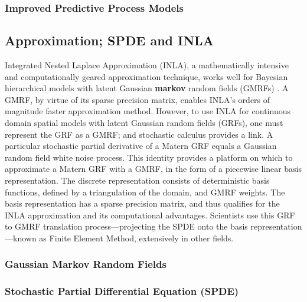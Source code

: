 \subsubsection{Improved Predictive Process Models}


\subsection{Approximation; SPDE and INLA} %
Integrated Nested Laplace Approximation (INLA), a mathematically intensive and computationally geared approximation technique, works well for Bayesian hierarchical models with latent Gaussian {\bf markov} random fields (GMRFs) \citep{Rue2007}. A GMRF, by virtue of its sparse precision matrix, enables INLA's orders of magnitude faster approximation method. However, to use INLA for continuous domain spatial models with latent Gaussian random fields (GRFs), one must represent the GRF as a GMRF; and stochastic calculus provides a link. A particular stochastic partial derivative of a Matern GRF equals a Gaussian random field white noise process. This identity provides a platform on which to approximate a Matern GRF with a GMRF, in the form of a piecewise linear basis representation. The discrete representation consists of deterministic basis functions, defined by a triangulation of the domain, and GMRF weights. The basis representation has a sparse precision matrix, and thus qualifies for the INLA approximation and its computational advantages. Scientists use this GRF to GMRF translation process---projecting the SPDE onto the basis representation---known as Finite Element Method, extensively in other fields. 
\subsubsection{Gaussian Markov Random Fields}

\subsubsection{Stochastic Partial Differential Equation (SPDE)} 

